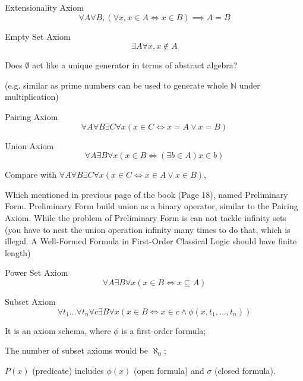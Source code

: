 \documentclass[12pt, a4paper, oneside]{article}
\begin{document}
    \begin{axiom}
        Extensionality Axiom
        $$\forall A \forall B ,(\forall x, x \in A \iff x \in B) \implies A = B$$
    \end{axiom}

    \begin{axiom}
        Empty Set Axiom
        $$\exists A \forall x, x \notin A$$
        \begin{remark}
            Does $\emptyset$ act like a unique generator in terms of abstract algebra?

             (e.g. similar as prime numbers can be used to generate whole $\mathbb{N}$ under multiplication)
        \end{remark}
    \end{axiom}

    \begin{axiom}
        Pairing Axiom
        $$\forall A \forall B \exists C \forall x(x \in C \iff x=A \vee x=B)$$ 
    \end{axiom}

    \begin{axiom}
        Union Axiom
        $$\forall A \exists B \forall x(x \in B \iff (\exists b \in A)x\in b)$$
        \begin{remark}
            Compare with $\forall A \forall B \exists C \forall x(x\in C \iff x\in A \vee x\in B)$,

            Which mentioned in previous page of the book (Page 18), named Preliminary Form. 
            Preliminary Form build union as a binary operator, similar to the Pairing Axiom.
            While the problem of Preliminary Form is can not tackle infinity sets 
            (you have to nest the union operation infinity many times to do that, which is illegal.
             A Well-Formed Formula in First-Order Classical Logic should have finite length)
        \end{remark}
    \end{axiom}

    \begin{axiom}
        Power Set Axiom
        $$\forall A \exists B \forall x(x\in B \iff x \subseteq A)$$
    \end{axiom}

    \begin{axiom}
        Subset Axiom
        $$\forall t_1 \dots \forall t_n \forall c \exists B \forall x(x\in B \iff x \in c \wedge \phi(x,t_1,\dots,t_n))$$
        \begin{remark}
            It is an axiom schema, where $\phi$ is a first-order formula;
            
            The number of subset axioms would be $\aleph_0$;

            $P(x)$ (predicate) includes $\phi(x)$ (open formula) and $\sigma$ (closed formula).
        \end{remark}
    \end{axiom}
\end{document}
